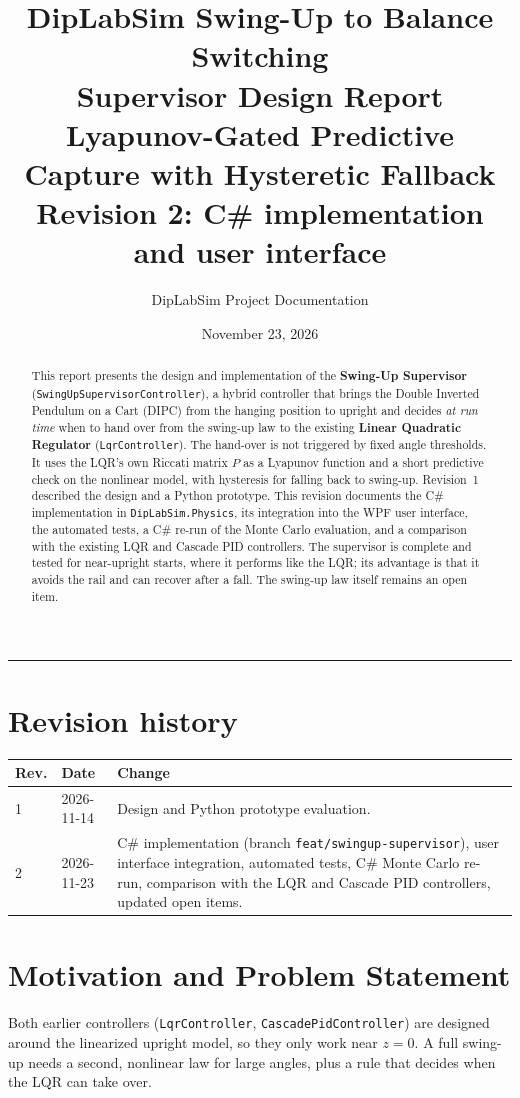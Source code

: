 \documentclass[11pt,a4paper]{article}
\title{\textbf{DipLabSim Swing-Up to Balance Switching\\Supervisor Design Report}\\[4pt]
\large Lyapunov-Gated Predictive Capture with Hysteretic Fallback\\[2pt]
\normalsize Revision 2: C\# implementation and user interface}
\author{DipLabSim Project Documentation}
\date{November 23, 2026}
\newcommand{\code}[1]{\texttt{#1}}
\begin{document}
\maketitle

\begin{abstract}
This report presents the design and implementation of the \textbf{Swing-Up Supervisor}
(\code{SwingUpSupervisorController}), a hybrid controller that brings the Double Inverted
Pendulum on a Cart (DIPC) from the hanging position to upright and decides \emph{at run time}
when to hand over from the swing-up law to the existing \textbf{Linear Quadratic Regulator}
(\code{LqrController}). The hand-over is not triggered by fixed angle thresholds. It uses the
LQR's own Riccati matrix $P$ as a Lyapunov function and a short predictive check on the
nonlinear model, with hysteresis for falling back to swing-up. Revision~1 described the design
and a Python prototype. This revision documents the C\# implementation in
\code{DipLabSim.Physics}, its integration into the WPF user interface, the automated tests,
a C\# re-run of the Monte Carlo evaluation, and a comparison with the existing LQR and Cascade
PID controllers. The supervisor is complete and tested for near-upright starts, where it
performs like the LQR; its advantage is that it avoids the rail and can recover after a fall.
The swing-up law itself remains an open item.
\end{abstract}

\tableofcontents
\vspace{6pt}\hrule

\section*{Revision history}
\begin{tabularx}{\linewidth}{@{}l l X@{}}
\toprule
Rev. & Date & Change \\
\midrule
1 & 2026-11-14 & Design and Python prototype evaluation. \\
2 & 2026-11-23 & C\# implementation (branch \code{feat/swingup-supervisor}), user interface
integration, automated tests, C\# Monte Carlo re-run, comparison with the LQR and Cascade PID
controllers, updated open items. \\
\bottomrule
\end{tabularx}

\section{Motivation and Problem Statement}
Both earlier controllers (\code{LqrController}, \code{CascadePidController}) are designed around
the linearized upright model, so they only work near $z = 0$. A full swing-up needs a second,
nonlinear law for large angles, plus a rule that decides when the LQR can take over.
\end{document}
